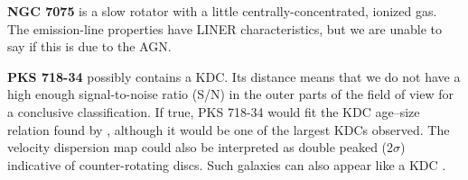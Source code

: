 \textbf{NGC 7075} is a slow rotator with a little centrally-concentrated, ionized gas. The emission-line properties have LINER characteristics, but we are unable to say if this is due to the AGN.

\textbf{PKS 718-34} possibly contains a KDC. Its distance means that we do not have a high enough signal-to-noise ratio (S/N) in the outer parts of the field of view for a conclusive classification. If true, PKS 718-34 would fit the KDC age--size relation found by \citet{Kuntschner2010}, although it would be one of the largest KDCs observed. The velocity dispersion map could also be interpreted as double peaked (2$\sigma$) indicative of counter-rotating discs. Such galaxies can also appear like a KDC \citep[e.g.][]{Bois2011}.
